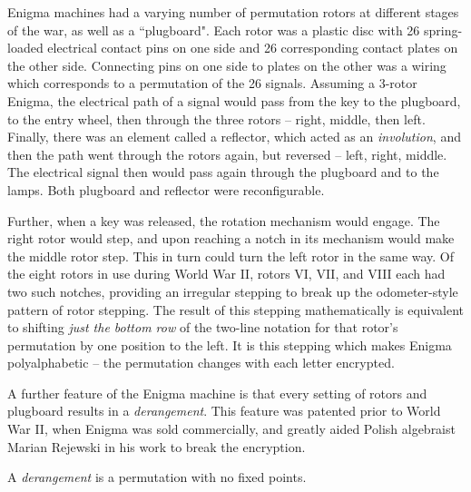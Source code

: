 \documentclass[m3380-lec-main.tex]{subfiles}
\begin{document}
Enigma machines had a varying number of permutation rotors at different stages of the war, as well as a ``plugboard". Each rotor was a plastic disc with 26 spring-loaded electrical contact pins on one side and 26 corresponding contact plates on the other side. Connecting pins on one side to plates on the other was a wiring which corresponds to a permutation of the 26 signals. Assuming a 3-rotor Enigma, the electrical path of a signal would pass from the key to the plugboard, to the entry wheel, then through the three rotors -- right, middle, then left. Finally, there was an element called a reflector, which acted as an \emph{involution}, and then the path went through the rotors again, but reversed -- left, right, middle. The electrical signal then would pass again through the plugboard and to the lamps. Both plugboard and reflector were reconfigurable.

Further, when a key was released, the rotation mechanism would engage. The right rotor would step, and upon reaching a notch in its mechanism would make the middle rotor step. This in turn could turn the left rotor in the same way. Of the eight rotors in use during World War II, rotors VI, VII, and VIII each had two such notches, providing an irregular stepping to break up the odometer-style pattern of rotor stepping. The result of this stepping mathematically is equivalent to shifting \emph{just the bottom row} of the two-line notation for that rotor's permutation by one position to the left. It is this stepping which makes Enigma polyalphabetic -- the permutation changes with each letter encrypted.

A further feature of the Enigma machine is that every setting of rotors and plugboard results in a \emph{derangement}. This feature was patented prior to World War II, when Enigma was sold commercially, and greatly aided Polish algebraist Marian Rejewski in his work to break the  encryption.

\begin{defn} A \emph{derangement} is a permutation with no fixed points.
\end{defn}
\end{document}
